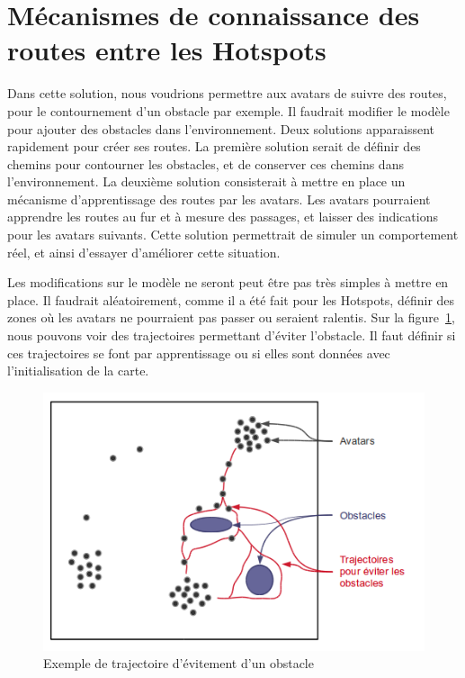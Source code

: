 \documentclass[11pt,a4paper]{article}
\begin{document}
\section{Mécanismes de connaissance des routes entre les Hotspots}
Dans cette solution, nous voudrions permettre aux avatars de suivre des routes, pour le contournement d'un obstacle par exemple. Il faudrait modifier le modèle pour ajouter des obstacles dans l'environnement. Deux solutions apparaissent rapidement pour créer ses routes. La première solution serait de définir des chemins pour contourner les obstacles, et de conserver ces chemins dans l'environnement. La deuxième solution consisterait à mettre en place un mécanisme d'apprentissage des routes par les avatars. Les avatars pourraient apprendre les routes au fur et à mesure des passages, et laisser des indications pour les avatars suivants. Cette solution permettrait de simuler un comportement réel, et ainsi d'essayer d'améliorer cette situation.
\par Les modifications sur le modèle ne seront peut être pas très simples à mettre en place. Il faudrait aléatoirement, comme il a été fait pour les Hotspots, définir des zones où les avatars ne pourraient pas passer ou seraient ralentis. Sur la figure~\ref{trajobstacle}, nous pouvons voir des trajectoires permettant d'éviter l'obstacle. Il faut définir si ces trajectoires se font par apprentissage ou si elles sont données avec l'initialisation de la carte.

	\begin{figure}[!h]
        \centering
        \includegraphics[scale=0.55]{./images/trajobstacle}
        \caption{Exemple de trajectoire d'évitement d'un obstacle}
        \label{trajobstacle}
	\end{figure}
\end{document}
